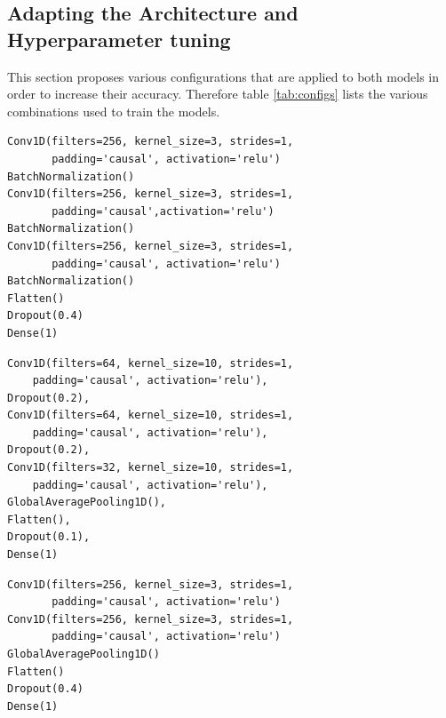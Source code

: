 \subsection{Adapting the Architecture and Hyperparameter tuning}
\label{sec:hyper}
This section proposes various configurations that are applied to both models in order to increase their accuracy. Therefore table \ref{tab:configs} lists the various combinations used to train the models.

\newsavebox{\codebox} %
\newsavebox{\codeboxtwo} %
\newsavebox{\codeboxthree} %
\newsavebox{\codeboxfour} %
\newsavebox{\codeboxfive} %

\newsavebox{\codeboxsix} %

\begin{lrbox}{\codeboxsix} %
\begin{lstlisting}[numbers=none, basicstyle=\tiny, numbersep=0pt, xleftmargin=0pt, xrightmargin=0pt, backgroundcolor=\color{white}]
Conv1D(filters=256, kernel_size=3, strides=1, 
	   padding='causal', activation='relu')
BatchNormalization()
Conv1D(filters=256, kernel_size=3, strides=1,
	   padding='causal',activation='relu')
BatchNormalization()
Conv1D(filters=256, kernel_size=3, strides=1, 
	   padding='causal', activation='relu')
BatchNormalization()
Flatten()
Dropout(0.4)
Dense(1)
\end{lstlisting}
\end{lrbox} %



\begin{lrbox}{\codeboxfive} %
\begin{lstlisting}[numbers=none, basicstyle=\tiny, numbersep=0pt, xleftmargin=0pt, xrightmargin=0pt, backgroundcolor=\color{white}]
Conv1D(filters=64, kernel_size=10, strides=1,
    padding='causal', activation='relu'),
Dropout(0.2),
Conv1D(filters=64, kernel_size=10, strides=1,
    padding='causal', activation='relu'),
Dropout(0.2),
Conv1D(filters=32, kernel_size=10, strides=1,
    padding='causal', activation='relu'),
GlobalAveragePooling1D(),
Flatten(),
Dropout(0.1),
Dense(1)
\end{lstlisting}
\end{lrbox} %


\begin{lrbox}{\codeboxfour} %
\begin{lstlisting}[numbers=none, basicstyle=\tiny, numbersep=0pt, xleftmargin=0pt, xrightmargin=0pt, backgroundcolor=\color{white}]
Conv1D(filters=256, kernel_size=3, strides=1,
       padding='causal', activation='relu')
Conv1D(filters=256, kernel_size=3, strides=1,
       padding='causal', activation='relu')
GlobalAveragePooling1D()
Flatten()
Dropout(0.4)
Dense(1)
\end{lstlisting}
\end{lrbox} %

